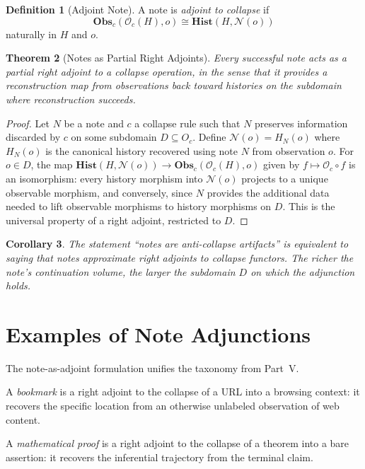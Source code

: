 \documentclass[12pt, a4paper, openany]{book}
\theoremstyle{plain}
\newtheorem{theorem}{Theorem}[chapter]
\newtheorem{corollary}[theorem]{Corollary}
\theoremstyle{definition}
\newtheorem{definition}[theorem]{Definition}
\theoremstyle{remark}
\newcommand{\Hist}{\mathbf{Hist}}
\newcommand{\Obs}{\mathbf{Obs}}
\begin{document}
\begin{definition}[Adjoint Note]
A note is \emph{adjoint to collapse} if
\[
\Obs_c(\mathcal{O}_c(H), o) \cong \Hist(H, \mathcal{N}(o))
\]
naturally in $H$ and $o$.
\end{definition}

\begin{theorem}[Notes as Partial Right Adjoints]
\label{thm:notes-adjoints}
Every successful note acts as a partial right adjoint to a collapse operation,
in the sense that it provides a reconstruction map from observations back toward
histories on the subdomain where reconstruction succeeds.
\end{theorem}

\begin{proof}
Let $N$ be a note and $c$ a collapse rule such that $N$ preserves information
discarded by $c$ on some subdomain $D \subseteq O_c$. Define
$\mathcal{N}(o) = H_N(o)$ where $H_N(o)$ is the canonical history recovered
using note $N$ from observation $o$. For $o \in D$, the map
$\Hist(H, \mathcal{N}(o)) \to \Obs_c(\mathcal{O}_c(H), o)$ given by
$f \mapsto \mathcal{O}_c \circ f$ is an isomorphism: every history morphism
into $\mathcal{N}(o)$ projects to a unique observable morphism, and conversely,
since $N$ provides the additional data needed to lift observable morphisms to
history morphisms on $D$. This is the universal property of a right adjoint,
restricted to $D$.
\end{proof}

\begin{corollary}
The statement ``notes are anti-collapse artifacts'' is equivalent to saying that
notes approximate right adjoints to collapse functors. The richer the note's
continuation volume, the larger the subdomain $D$ on which the adjunction holds.
\end{corollary}

\section{Examples of Note Adjunctions}

The note-as-adjoint formulation unifies the taxonomy from Part~V.

A \emph{bookmark} is a right adjoint to the collapse of a URL into a browsing
context: it recovers the specific location from an otherwise unlabeled observation
of web content.

A \emph{mathematical proof} is a right adjoint to the collapse of a theorem
into a bare assertion: it recovers the inferential trajectory from the terminal
claim.
\end{document}
